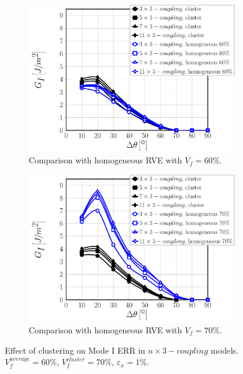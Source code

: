 \documentclass[review]{elsarticle}
\begin{document}
\begin{figure}[!h]
\centering
    \begin{subfigure}[b]{0.475\textwidth}
        \includegraphics[width=\textwidth]{nx1-coupling-vf60-GI.pdf}
        \caption{Comparison with homogeneous RVE with $V_{f}=60\%$.}\label{subfig:clusterCouplingnx3ModeI60}
    \end{subfigure}\quad
    \begin{subfigure}[b]{0.475\textwidth}
        \includegraphics[width=\textwidth]{nx1-coupling-vf70-GI.pdf}
        \caption{Comparison with homogeneous RVE with $V_{f}=70\%$.}\label{subfig:clusterCouplingnx3ModeI70}
    \end{subfigure}

\caption{Effect of clustering on Mode I ERR in $n\times 3-coupling$ models. $V^{average}_{f}=60\%$, $V^{cluster}_{f}=70\%$, $\varepsilon_{x}=1\%$.}\label{fig:clusterCouplingnx3ModeI}
\end{figure}
\end{document}
